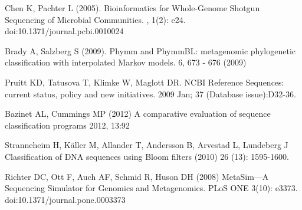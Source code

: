 \documentclass[12pt]{article} %
\begin{document}
\begin{thebibliography}{99} %
Chen K, Pachter L (2005). 
\newblock Bioinformatics for Whole-Genome Shotgun Sequencing of Microbial Communities. 
, 1(2): e24. doi:10.1371/journal.pcbi.0010024

Brady A, Salzberg S (2009).
\newblock Phymm and PhymmBL: metagenomic phylogenetic classification with interpolated Markov models.
 6, 673 - 676 (2009) 

Pruitt KD, Tatusova T, Klimke W, Maglott DR. 
\newblock NCBI Reference Sequences: current status, policy and new initiatives. 
 2009 Jan; 37 (Database issue):D32-36.

Bazinet AL, Cummings MP (2012)
\newblock A comparative evaluation of sequence classification programs
 2012, 13:92

Stranneheim H, Käller M,  Allander T,  Andersson B,  Arvestad L,  Lundeberg J 
\newblock Classification of DNA sequences using Bloom filters
 (2010) 26 (13): 1595-1600.


Richter DC, Ott F, Auch AF, Schmid R, Huson DH (2008)
\newblock MetaSim—A Sequencing Simulator for Genomics and Metagenomics. 
\newblock PLoS ONE 3(10): e3373. doi:10.1371/journal.pone.0003373
\end{thebibliography}
\end{document}
